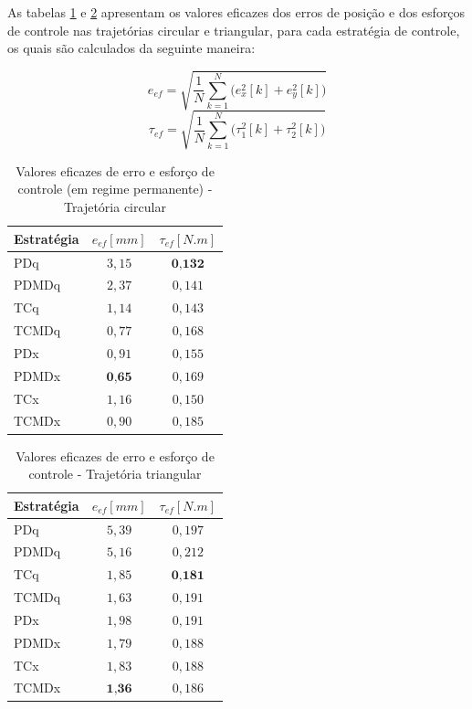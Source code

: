 \documentclass[]{politex}
\begin{document}
As tabelas \ref{tab:valoresEficazesCirculo} e \ref{tab:valoresEficazesTriangulo} apresentam os valores eficazes dos erros de posição e dos esforços de controle nas trajetórias circular e triangular, para cada estratégia de controle, os quais são calculados da seguinte maneira:

\begin{equation}
e_{ef} = \sqrt{ \frac{1}{N}\sum_{k=1}^N \Big( e_x^2[k] + e_y^2[k] \Big) }
\end{equation}
\begin{equation}
\tau_{ef} = \sqrt{ \frac{1}{N}\sum_{k=1}^N \Big( \tau_1^2[k] + \tau_2^2[k] \Big) }
\end{equation}

\begin{table}[H] 
\centering
\caption{Valores eficazes de erro e esforço de controle (em regime permanente) - Trajetória circular}
\label{tab:valoresEficazesCirculo}
\begin{tabular}{l|c|c}
Estratégia & $e_{ef} [mm]$      & $\tau_{ef} [N.m] $ \\ \hline
PDq        & $3{,}15$             & $\textbf{0,132}$      \\
PDMDq      & $2{,}37$             & $0{,}141$               \\
TCq        & $1{,}14$             & $0{,}143$               \\
TCMDq      & $0{,}77$             & $0{,}168$               \\
PDx        & $0{,}91$             & $0{,}155$               \\
PDMDx      & $\textbf{0,65}$    & $0{,}169$               \\
TCx        & $1{,}16$             & $0{,}150$               \\
TCMDx      & $0{,}90$             & $0{,}185$               \\
\end{tabular}
\end{table}

\begin{table}[H] 
\centering
\caption{Valores eficazes de erro e esforço de controle - Trajetória triangular}
\label{tab:valoresEficazesTriangulo}
\begin{tabular}{l|c|c}
Estratégia & $e_{ef} [mm]$  & $\tau_{ef} [N.m] $ \\ \hline
PDq        & $5{,}39$         & $0{,}197$               \\
PDMDq      & $5{,}16$         & $0{,}212$               \\
TCq        & $1{,}85$         & $\textbf{0,181}$      \\
TCMDq      & $1{,}63$         & $0{,}191$               \\
PDx        & $1{,}98$         & $0{,}191$               \\
PDMDx      & $1{,}79$         & $0{,}188$               \\
TCx        & $1{,}83$         & $0{,}188$               \\
TCMDx      & $\textbf{1,36}$  & $0{,}186$               \\
\end{tabular}
\end{table}
\end{document}
